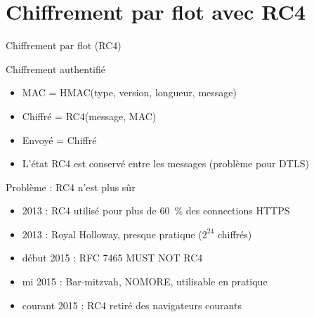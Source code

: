 \documentclass{mpg-ep-slides}
\begin{document}

\section[Flot]{Chiffrement par flot avec RC4}
\tocsect

\begin{frame}{Chiffrement par flot (RC4)}
  \begin{block}{Chiffrement authentifié}
    \begin{itemize}
      \item MAC = HMAC(type, version, longueur, message)
      \item Chiffré = RC4(message, MAC)
      \item Envoyé = Chiffré
      \item L'état RC4 est conservé entre les messages (problème pour DTLS)
    \end{itemize}
  \end{block}

  \begin{block}{Problème : RC4 n'est plus sûr}
    \begin{itemize}
      \item 2013 : RC4 utilisé pour plus de 60~\% des connections HTTPS
      \item 2013 : Royal Holloway, presque pratique ($2^{24}$ chiffrés)
      \item début 2015 : RFC 7465 MUST NOT RC4
      \item mi 2015 : Bar-mitzvah, NOMORE, utilisable en pratique
      \item courant 2015 : RC4 retiré des navigateurs courants
    \end{itemize}
  \end{block}
\end{frame}
\end{document}
